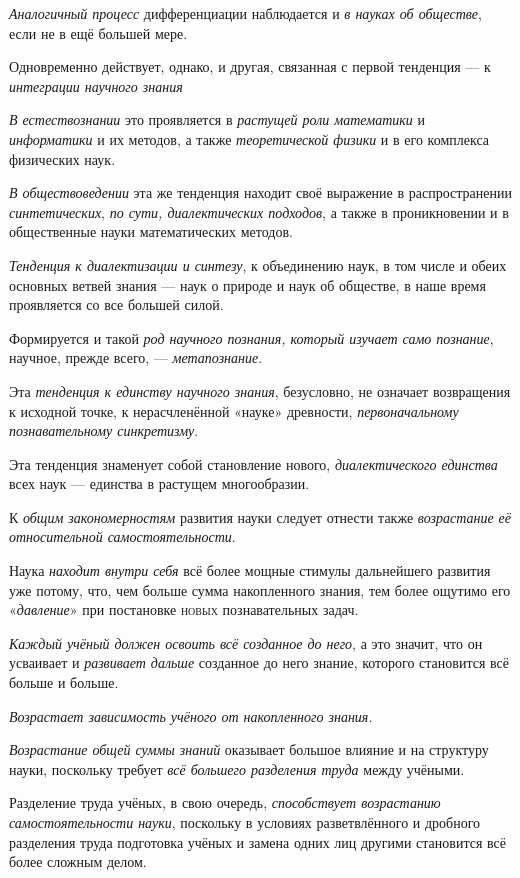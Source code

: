 \documentclass[a4paper,14pt,russian]{extreport}
\begin{document}
\emph{Аналогичный процесс} дифференциации наблюдается и \emph{в науках об обществе}, если не в ещё большей мере.

Одновременно действует, однако, и другая, связанная с первой тенденция --- к \emph{интеграции научного знания}

\emph{В естествознании} это проявляется в \emph{растущей роли математики} и \emph{информатики} и их методов, а также \emph{теоретической физики} и в его комплекса физических наук.

\emph{В обществоведении} эта же тенденция находит своё выражение в распространении \emph{синтетических}, \emph{по сути, диалектических подходов}, а также в проникновении и в общественные науки математических методов.

\emph{Тенденция к диалектизации и синтезу}, к объединению наук, в том числе и обеих основных ветвей знания --- наук о природе и наук об обществе, в наше время проявляется со все большей силой.

Формируется и такой \emph{род научного познания, который изучает само познание}, научное, прежде всего, --- \emph{метапознание}.

Эта \emph{тенденция к единству научного знания}, безусловно, не означает возвращения к исходной точке, к нерасчленённой «науке» древности, \emph{первоначальному познавательному синкретизму}.

Эта тенденция знаменует собой становление нового, \emph{диалектического единства} всех наук --- единства в растущем многообразии.

К \emph{общим закономерностям} развития науки следует отнести также \emph{возрастание её относительной самостоятельности}.

Наука \emph{находит внутри себя} всё более мощные стимулы дальнейшего развития уже потому, что, чем больше сумма накопленного знания, тем более ощутимо его «\emph{давление}» при постановке \textsc{новых} познавательных задач.

\emph{Каждый учёный должен освоить всё созданное до него}, а это значит, что он усваивает и \emph{развивает дальше} созданное до него знание, которого становится всё больше и больше.

\emph{Возрастает зависимость учёного от накопленного знания.}

\emph{Возрастание общей суммы знаний} оказывает большое влияние и на структуру науки, поскольку требует \emph{всё большего разделения труда} между учёными.

Разделение труда учёных, в свою очередь, \emph{способствует возрастанию самостоятельности науки}, поскольку в условиях разветвлённого и дробного разделения труда подготовка учёных и замена одних лиц другими становится всё более сложным делом.
\end{document}
